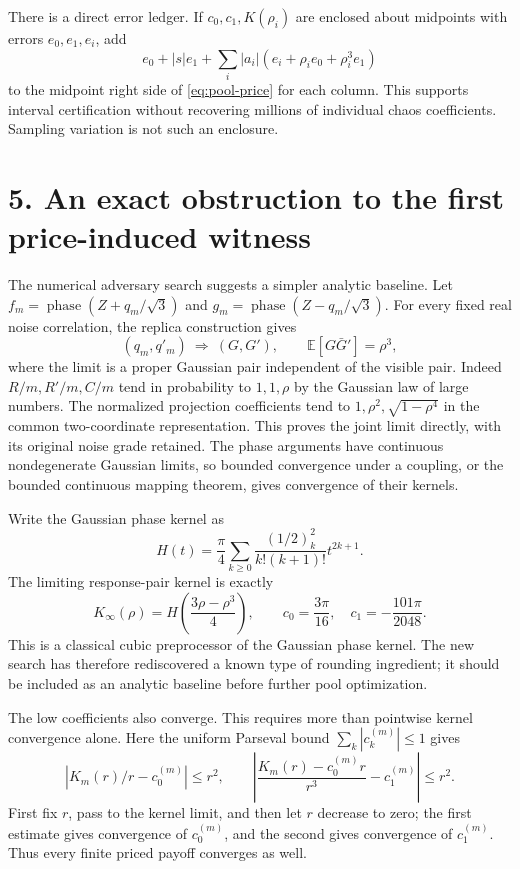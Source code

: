 \documentclass[11pt]{article}
\newcommand{\E}{\mathbb E}
\newcommand{\ph}{\operatorname{phase}}
\begin{document}
There is a direct error ledger. If $c_0,c_1,K(\rho_i)$ are enclosed about
midpoints with errors $e_0,e_1,e_i$, add
\[
 e_0+|s|e_1+\sum_i|a_i|(e_i+\rho_i e_0+\rho_i^3e_1)
\]
to the midpoint right side of \eqref{eq:pool-price} for each column. This
supports interval certification without recovering millions of individual
chaos coefficients. Sampling variation is not such an enclosure.

\section*{5. An exact obstruction to the first price-induced witness}
The numerical adversary search suggests a simpler analytic baseline.
Let $f_m=\ph(Z+q_m/\sqrt3)$ and $g_m=\ph(Z-q_m/\sqrt3)$.
For every fixed real noise correlation, the replica construction gives
\[
 (q_m,q'_m)\ \Longrightarrow\ (G,G'),\qquad
 \E[G\bar G']=\rho^3,
\]
where the limit is a proper Gaussian pair independent of the visible pair.
Indeed $R/m,R'/m,C/m$ tend in probability to $1,1,\rho$ by the Gaussian law
of large numbers. The normalized projection coefficients tend to
$1,\rho^2,\sqrt{1-\rho^4}$ in the common two-coordinate representation.
This proves the joint limit directly, with its original noise grade retained.
The phase arguments have continuous nondegenerate Gaussian limits, so bounded
convergence under a coupling, or the bounded continuous mapping theorem,
gives convergence of their kernels.

Write the Gaussian phase kernel as
\[
 H(t)=\frac\pi4\sum_{k\ge0}
   \frac{(1/2)_k^2}{k!(k+1)!}t^{2k+1}.
\]
The limiting response-pair kernel is exactly
\[
 K_\infty(\rho)=H\left(\frac{3\rho-\rho^3}{4}\right),\qquad
 c_0=\frac{3\pi}{16},\quad c_1=-\frac{101\pi}{2048}.
\]
This is a classical cubic preprocessor of the Gaussian phase kernel. The
new search has therefore rediscovered a known type of rounding ingredient;
it should be included as an analytic baseline before further pool optimization.

The low coefficients also converge. This requires more than pointwise kernel
convergence alone. Here the uniform Parseval bound $\sum_k|c_k^{(m)}|\le1$
gives
\[
 |K_m(r)/r-c_0^{(m)}|\le r^2,\qquad
 \left|\frac{K_m(r)-c_0^{(m)}r}{r^3}-c_1^{(m)}\right|\le r^2.
\]
First fix $r$, pass to the kernel limit, and then let $r$ decrease to zero;
the first estimate gives convergence of $c_0^{(m)}$, and the second gives
convergence of $c_1^{(m)}$. Thus every finite priced payoff converges as well.
\end{document}
